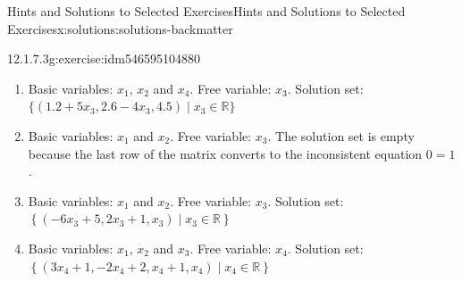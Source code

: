 \documentclass[oneside,10pt,]{book}
\newcommand{\blocktitlefont}{\relax}
\numberwithin{equation}{section}
\begin{document}
\begin{solutions-chapter}{Hints and Solutions to Selected Exercises}{}{Hints and Solutions to Selected Exercises}{}{}{x:solutions:solutions-backmatter}
\begin{divisionsolution}{12.1.7.3}{}{g:exercise:idm546595104880}
\begin{enumerate}[label=(\alph*)]
\item{}Basic variables: \(x_1\), \(x_2\) and \(x_4\).  Free variable: \(x_3\).  Solution set:  \(\{(1.2+5x_3, 2.6-4 x_3, 4.5) \mid x_3 \in \mathbb{R}\}\)%
\item{}Basic variables: \(x_1\) and \(x_2\).  Free variable: \(x_3\). The solution set is empty because the last row of the matrix converts to the inconsistent equation \(0=1\).%
\item{}Basic variables: \(x_1\) and \(x_2\).  Free variable: \(x_3\).  Solution set: \(\left\{\left(-6 x_3 + 5, 2 x_3+1, x_3 \right) \mid x_3 \in  \mathbb{R}\right\}\)%
\item{}Basic variables: \(x_1\), \(x_2\) and \(x_3\).  Free variable: \(x_4\). Solution set: \(\left\{\left(3 x_4 + 1, -2x_4 + 2, x_4 + 1, x_4\right) \mid  x_4 \in  \mathbb{R}\right\}\)%
\end{enumerate}
%
\end{divisionsolution}%
%
%

\end{solutions-chapter}
\end{document}
